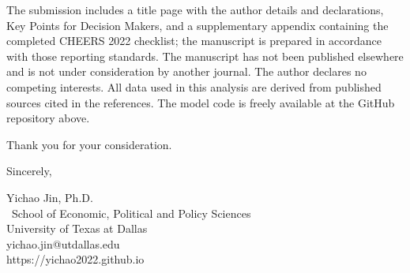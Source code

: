 \documentclass[11pt]{article}
\begin{document}
\begin{flushleft}
The submission includes a title page with the author details and declarations, Key Points for Decision Makers, and a supplementary appendix containing the completed CHEERS 2022 checklist; the manuscript is prepared in accordance with those reporting standards. The manuscript has not been published elsewhere and is not under consideration by another journal. The author declares no competing interests. All data used in this analysis are derived from published sources cited in the references. The model code is freely available at the GitHub repository above.

Thank you for your consideration.

\vspace{20pt}

Sincerely,

\vspace{20pt}

Yichao Jin, Ph.D.\\
\
School of Economic, Political and Policy Sciences\\
University of Texas at Dallas\\
yichao.jin@utdallas.edu\\
https://yichao2022.github.io\\

\end{flushleft}
\end{document}
